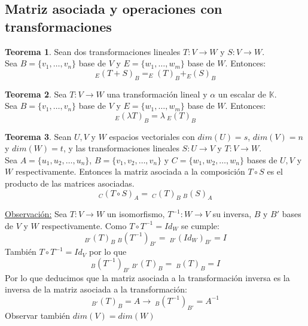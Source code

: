 \documentclass[10pt]{article}
\theoremstyle{definition}
\newtheorem{theorem}{Teorema}[section]
\begin{document}
\subsection{Matriz asociada y operaciones con transformaciones}
\begin{theorem}
	Sean dos transformaciones lineales $T:V\to W$ y $S:V\to W$.\\
	Sea $B=\{v_1,\dots,v_n\}$ base de $V$ y $E=\{w_1,\dots,w_m\}$ base de $W$. Entonces:
	$$_E(T+S)_B= _E(T)_B+_E(S)_B$$
\end{theorem}
\begin{theorem}
	Sea $T:V\to W$ una transformación lineal y $\alpha$ un escalar de $\mathbb{K}$.\\
	Sea $B=\{v_1,\dots,v_n\}$ base de $V$ y $E=\{w_1,\dots,w_m\}$ base de $W$. Entonces:
	$$_E(\lambda T)_B=\lambda \ _E(T)_B$$
\end{theorem}
\begin{theorem}
	Sean $U, V$ y $W$ espacios vectoriales con $dim(U)=s$, $dim(V)=n$ y $dim(W)=t$, y las transformaciones lineales $S:U\rightarrow V$ y $T:V\rightarrow W$.
	\\Sea $A=\{u_1,u_2,\dots,u_n\}$, $B=\{v_1,v_2,\dots,v_n\}$ y $C=\{w_1,w_2,\dots,w_n\}$ bases de $U, V$ y $W$ respectivamente. Entonces la matriz asociada a la composición $T\circ S$ es el producto de las matrices asociadas.
	$$
		_C(T\circ S)_A=\ _C(T)_B\ _B(S)_A
	$$
\end{theorem}
\underline{Observación:} Sea $T:V\rightarrow W$ un isomorfismo, $T^{-1}:W\rightarrow V$ su inversa, $B$ y $B'$ bases de $V$ y $W$ respectivamente. Como $T\circ T^{-1}=Id_W$ se cumple:
$$
	_{B'}(T)_B \ _B(T^{-1})_{B'}=\ _{B'}(Id_W)_{B'}=I
$$
También $T\circ T^{-1}=Id_V$ por lo que
$$
	_B(T^{-1})_{B'} \ _{B'}(T)_B=\ _B(T)_B=I
$$
Por lo que deducimos que la matriz asociada a la transformación inversa es la inversa de la matriz asociada a la transformación:
$$
	_{B'}(T)_B=A\rightarrow \ _B(T^{-1})_{B'}=A^{-1}
$$
Observar también $dim(V)=dim(W)$
\end{document}
